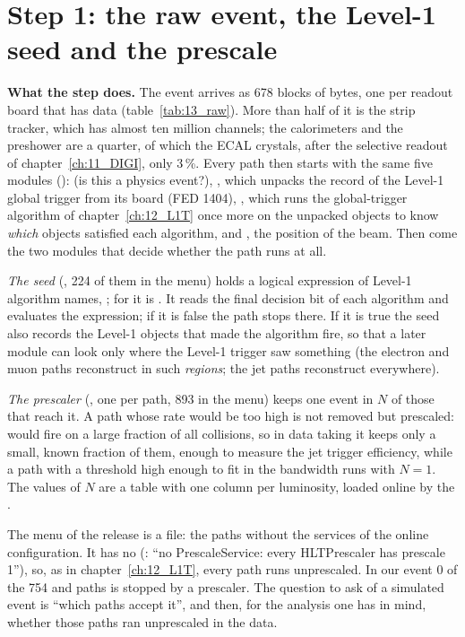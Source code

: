 \section{Step 1: the raw event, the Level-1 seed and the prescale}

\textbf{What the step does.} The event arrives as 678 blocks of bytes, one per readout board that has data
(table~\ref{tab:13_raw}). More than half of it is the strip tracker, which has almost ten million channels; the calorimeters
and the preshower are a quarter, of which the ECAL crystals, after the selective readout of chapter~\ref{ch:11_DIGI},
only 3\,\%. Every path then starts with the same five modules (): 
(is this a physics event?), , which unpacks the record of the Level-1 global trigger from its
board (FED 1404), , which runs the global-trigger algorithm of chapter~\ref{ch:12_L1T}
once more on the unpacked objects to know \emph{which} objects satisfied each algorithm,
 and , the position of the beam. Then come the two modules that decide whether the path runs at all.

\emph{The seed} (, 224 of them in the menu) holds a logical expression of Level-1 algorithm names,
; for  it is . It reads the final
decision bit of each algorithm and evaluates the expression; if it is false the path stops there. If it is true the
seed also records the Level-1 objects that made the algorithm fire, so that a later module can look only where
the Level-1 trigger saw something (the electron and muon paths reconstruct in such \emph{regions}; the jet paths
reconstruct everywhere).

\emph{The prescaler} (, one per path, 893 in the menu) keeps one event in $N$ of those that reach
it. A path whose rate would be too high is not removed but prescaled:  would fire on a large
fraction of all collisions, so in data taking it keeps only a small, known fraction of them, enough to measure the
jet trigger efficiency, while a path with a threshold high enough to fit in the bandwidth runs with $N=1$. The
values of $N$ are a table with one column per luminosity, loaded online by the .

\begin{plainwords}
The menu of the release is a  file: the paths without the services of the online configuration. It has
no  (: ``no PrescaleService: every HLTPrescaler has prescale 1''), so,
as in chapter~\ref{ch:12_L1T}, every path runs unprescaled. In our event 0 of the 754  and 
paths is stopped by a prescaler. The question to ask of a simulated event is ``which paths accept it'', and then, for
the analysis one has in mind, whether those paths ran unprescaled in the data.
\end{plainwords}

